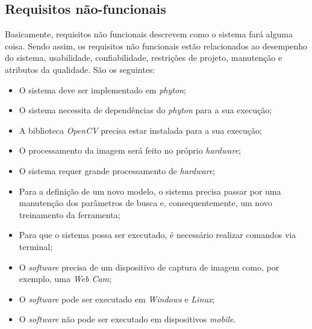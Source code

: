 \subsection{{Requisitos não-funcionais}}

Basicamente, requisitos não funcionais descrevem como o sistema fará alguma coisa. Sendo assim, os requisitos não funcionais estão relacionados ao desempenho do sistema, usabilidade, confiabilidade, restrições de projeto, manutenção e atributos da qualidade. São os seguintes:

\begin{itemize}
\raggedright \item O sistema deve ser implementado em \textit{phyton};

\raggedright \item O sistema necessita de dependências do \textit{phyton} para a sua execução;

\raggedright \item A biblioteca \textit{OpenCV} precisa estar instalada para a sua execução;

\raggedright \item O processamento da imagem será feito no próprio \textit{hardware};

\raggedright \item O sistema requer grande processamento de \textit{hardware};

\raggedright \item Para a definição de um novo modelo, o sistema precisa passar por uma manutenção dos parâmetros de busca e, consequentemente, um novo treinamento da ferramenta;

\raggedright \item Para que o sistema possa ser executado, é necessário realizar comandos via terminal;

\raggedright \item O \textit{software} precisa de um dispositivo de captura de imagem como, por exemplo, uma \textit{Web Cam};

\raggedright \item O \textit{software} pode ser executado em \textit{Windows} e \textit{Linux};

\raggedright \item O \textit{software} não pode ser executado em dispositivos \textit{mobile}.
\end{itemize}
